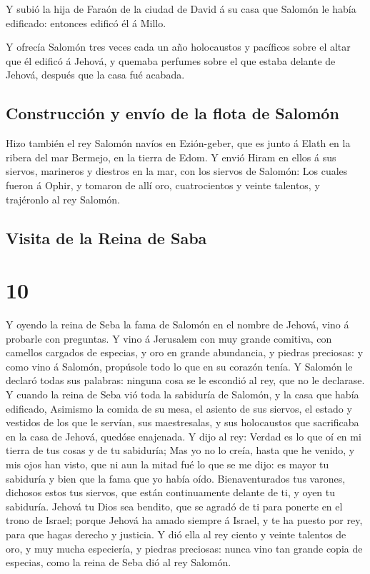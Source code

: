  Y subió la hija de Faraón de la ciudad de David á su casa
que Salomón le había edificado: entonces edificó él á Millo.

 Y ofrecía Salomón tres veces cada un año holocaustos y
pacíficos sobre el altar que él edificó á Jehová, y quemaba perfumes
sobre el que estaba delante de Jehová, después que la casa fué acabada.

\hypertarget{construcciuxf3n-y-envuxedo-de-la-flota-de-salomuxf3n}{%
\subsection{Construcción y envío de la flota de
Salomón}\label{construcciuxf3n-y-envuxedo-de-la-flota-de-salomuxf3n}}

 Hizo también el rey Salomón navíos en Ezión-geber, que es
junto á Elath en la ribera del mar Bermejo, en la tierra de Edom.
 Y envió Hiram en ellos á sus siervos, marineros y diestros
en la mar, con los siervos de Salomón:  Los cuales fueron á
Ophir, y tomaron de allí oro, cuatrocientos y veinte talentos, y
trajéronlo al rey Salomón.

\hypertarget{visita-de-la-reina-de-saba}{%
\subsection{Visita de la Reina de
Saba}\label{visita-de-la-reina-de-saba}}

\hypertarget{section-9}{%
\section{10}\label{section-9}}

 Y oyendo la reina de Seba la fama de Salomón en el nombre
de Jehová, vino á probarle con preguntas.  Y vino á
Jerusalem con muy grande comitiva, con camellos cargados de especias, y
oro en grande abundancia, y piedras preciosas: y como vino á Salomón,
propúsole todo lo que en su corazón tenía.  Y Salomón le
declaró todas sus palabras: ninguna cosa se le escondió al rey, que no
le declarase.  Y cuando la reina de Seba vió toda la
sabiduría de Salomón, y la casa que había edificado, 
Asimismo la comida de su mesa, el asiento de sus siervos, el estado y
vestidos de los que le servían, sus maestresalas, y sus holocaustos que
sacrificaba en la casa de Jehová, quedóse enajenada.  Y dijo
al rey: Verdad es lo que oí en mi tierra de tus cosas y de tu sabiduría;
 Mas yo no lo creía, hasta que he venido, y mis ojos han
visto, que ni aun la mitad fué lo que se me dijo: es mayor tu sabiduría
y bien que la fama que yo había oído.  Bienaventurados tus
varones, dichosos estos tus siervos, que están continuamente delante de
ti, y oyen tu sabiduría.  Jehová tu Dios sea bendito, que se
agradó de ti para ponerte en el trono de Israel; porque Jehová ha amado
siempre á Israel, y te ha puesto por rey, para que hagas derecho y
justicia.  Y dió ella al rey ciento y veinte talentos de
oro, y muy mucha especiería, y piedras preciosas: nunca vino tan grande
copia de especias, como la reina de Seba dió al rey Salomón.

